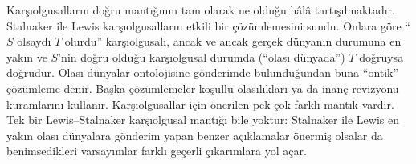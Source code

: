 \documentclass[../../../include/open-logic-section]{subfiles}
\begin{document}
Karşıolgusalların doğru mantığının tam olarak ne olduğu hâlâ tartışılmaktadır.
Stalnaker ile Lewis karşıolgusalların etkili bir çözümlemesini sundu. Onlara
göre ``$S$ olsaydı $T$ olurdu'' karşıolgusalı, ancak ve ancak gerçek dünyanın
durumuna en yakın ve $S$'nin doğru olduğu karşıolgusal durumda (``olası
dünyada'') $T$ doğruysa doğrudur. Olası dünyalar ontolojisine gönderimde
bulunduğundan buna ``ontik'' çözümleme denir. Başka çözümlemeler koşullu
olasılıkları ya da inanç revizyonu kuramlarını kullanır. Karşıolgusallar için
önerilen pek çok farklı mantık vardır. Tek bir Lewis--Stalnaker karşıolgusal
mantığı bile yoktur: Stalnaker ile Lewis en yakın olası dünyalara gönderim
yapan benzer açıklamalar önermiş olsalar da benimsedikleri varsayımlar farklı
geçerli çıkarımlara yol açar.
\end{document}
